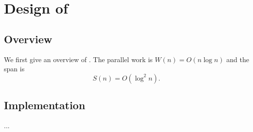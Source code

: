 \section{Design of \sys}
\label{sec:design}


\subsection{Overview}
We first give an overview of \sys.
The parallel work is $W(n) = O(n \log n)$ and the span is
\begin{equation}
  S(n) = O(\log^2 n).
  \label{eq:span}
\end{equation}

\subsection{Implementation}
...
